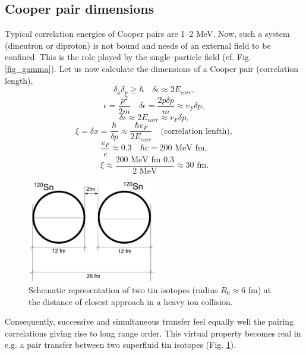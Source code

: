 \documentclass[a4paper,11pt]{book}
\numberwithin{equation}{section}
\numberwithin{figure}{section}
\numberwithin{table}{section}
\begin{document}
\begin{subappendices}
\subsection{Cooper pair dimensions}
Typical correlation energies of Cooper pairs are 1--2 MeV. Now, such a system (dineutron or diproton) is not bound and needs of an external field to be confined. This is the role played by the single--particle field (cf. Fig. \ref{fig_gamma}). Let us now calculate the dimensions of a Cooper pair (correlation length),
\begin{equation}
\delta_x\delta_p\ge \hbar\quad \delta\epsilon\approx 2E_{corr},
\end{equation}
\begin{equation}
\epsilon=\frac{p^2}{2m}\quad\delta\epsilon=\frac{2p\delta p}{m}\approx v_F\delta p,
\end{equation}
\begin{equation}
\delta\epsilon\approx 2 E_{corr}\approx v_F\delta p,
\end{equation}
\begin{equation}
\xi=\delta x=\frac{\hbar}{\delta p}\approx \frac{\hbar v_F}{2 E_{corr}}\quad \text{(correlation lenfth)},
\end{equation}
\begin{equation}
\frac{v_F}{c}\approx 0.3 \quad \hbar c=200 \text{ MeV fm},
\end{equation}
\begin{equation}
\xi\approx \frac{200\text{ MeV fm }0.3}{2 \text{ MeV}}\approx 30 \text{ fm}.
\end{equation}
\begin{figure}
\centerline{\includegraphics*[width=0.5\textwidth,angle=0]{figs/fig_1.pdf}}
\caption{Schematic representation of two tin isotopes (radius $R_0\approx 6$ fm) at the distance of closest approach in a heavy ion collision.}\label{fig_1}
\end{figure}

Consequently, successive and simultaneous transfer feel equally well the pairing correlations giving rise to long range order. This virtual property becomes real in e.g. a pair transfer between two superfluid tin isotopes (Fig. \ref{fig_1}).

\end{subappendices}
\end{document}
